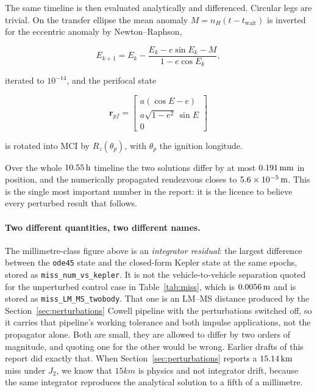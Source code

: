 The same timeline is then evaluated analytically and differenced. Circular legs
are trivial. On the transfer ellipse the mean anomaly $M = n_H (t - t_{\text{wait}})$
is inverted for the eccentric anomaly by Newton--Raphson,

\begin{equation}
E_{k+1} = E_k - \frac{E_k - e\sin E_k - M}{1 - e\cos E_k},
\label{eq:kepler}
\end{equation}

iterated to $10^{-14}$, and the perifocal state

\begin{equation}
\mathbf r_{pf} = \begin{bmatrix} a(\cos E - e) \\ a\sqrt{1-e^2}\,\sin E \\ 0 \end{bmatrix}
\label{eq:perifocal}
\end{equation}

is rotated into MCI by $R_z(\theta_p)$, with $\theta_p$ the ignition longitude.

Over the whole $10.55\,\mathrm{h}$ timeline the two solutions differ by at most
$0.191\,\mathrm{mm}$ in position, and the numerically propagated rendezvous
closes to $5.6\times 10^{-5}\,\mathrm{m}$. This is the single most important number in the
report: it is the licence to believe every perturbed result that follows.

\paragraph{Two different quantities, two different names.}
The millimetre-class figure above is an \emph{integrator residual}: the largest
difference between the \texttt{ode45} state and the closed-form Kepler state at
the same epochs, stored as \texttt{miss\_num\_vs\_kepler}. It is not the
vehicle-to-vehicle separation quoted for the unperturbed control case in
Table~\ref{tab:miss}, which is $0.0056\,\mathrm{m}$ and is stored as
\texttt{miss\_LM\_MS\_twobody}. That one is an LM--MS distance produced by the
Section~\ref{sec:perturbations} Cowell pipeline with the perturbations switched
off, so it carries that pipeline's working tolerance and both impulse
applications, not the propagator alone. Both are small, they are allowed to
differ by two orders of magnitude, and quoting one for the other would be
wrong. Earlier drafts of this report did exactly that.
When Section~\ref{sec:perturbations} reports a $15.14\,\mathrm{km}$ miss under
$J_2$, we know that $15\unit{km}$ is physics and not integrator drift, because
the same integrator reproduces the analytical solution to a fifth of a
millimetre.

